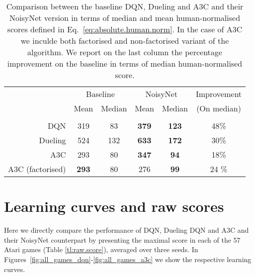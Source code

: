\documentclass{article}
\newcommand{\algoinit}{NoisyNet}
\begin{document}
\begin{table}[ht!]
\centering
\begin{tabular}{rccccc}
\toprule
 & \multicolumn{2}{c}{Baseline} & \multicolumn{2}{c}{\algoinit{}}&Improvement \\
 & Mean & Median & Mean & Median& (On median) \\
 \hline
 \\
DQN & 319 & 83 & \textbf{379} & \textbf{123} & 48\%\\ 
Dueling & 524 & 132 & \textbf{633} & \textbf{172} & 30\% \\
A3C & 293 & 80 & \textbf{347} & \textbf{94} &  18\%\\
A3C (factorised) & \textbf{293} & 80 & 276 & \textbf{99} & 24  \%\\
\bottomrule
\end{tabular}
\caption{Comparison between the baseline DQN, Dueling and A3C   and their \algoinit{} version in terms of median and mean human-normalised scores defined in Eq.~\eqref{eq:absolute.human.norm}. In the case of A3C we inculde both factorised and non-factorised variant of the algorithm. We report on the last column the percentage  improvement on the baseline in terms of median human-normalised score.}
\label{table:factorised}
\end{table}



\newpage
\section{Learning curves and raw scores}
\label{sec:learning_curves}

Here we directly compare the performance of DQN, Dueling DQN and A3C and their NoisyNet counterpart by presenting the maximal score in each of the 57 Atari games (Table \ref{tl:raw.score}), averaged over three seeds. In Figures~\ref{fig:all_games_dqn}-\ref{fig:all_games_a3c} we show the respective learning curves. 
\end{document}
